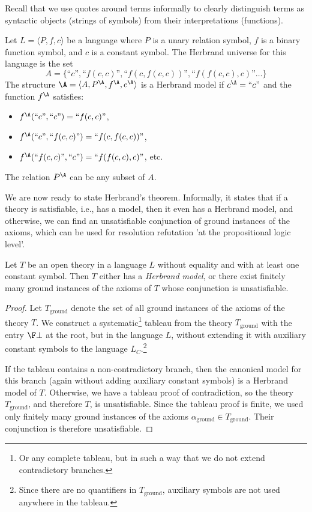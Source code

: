 Recall that we use quotes around terms informally to clearly distinguish terms as syntactic objects (strings of symbols) from their interpretations (functions).

\begin{example}
Let $L=\langle P,f,c\rangle$ be a language where $P$ is a unary relation symbol, $f$ is a binary function symbol, and $c$ is a constant symbol. The Herbrand universe for this language is the set
$$
A=\{\text{``$c$''},\text{``$f(c,c)$''},\text{``$f(c,f(c,c))$''},\text{``$f(f(c,c),c)$''}\dots\}
$$
The structure $\A=\langle A,P^\A,f^\A,c^\A\rangle$ is a Herbrand model if $c^\A=\text{``$c$''}$ and the function $f^\A$ satisfies:
\begin{itemize}
    \item $f^\A(\text{``$c$''},\text{``$c$''})=\text{``$f(c,c)$''}$,
    \item $f^\A(\text{``$c$''},\text{``$f(c,c)$''})=\text{``$f(c,f(c,c))$''}$,
    \item $f^\A(\text{``$f(c,c)$''},\text{``$c$''})=\text{``$f(f(c,c),c)$''}$, etc.
\end{itemize}
The relation $P^\A$ can be any subset of $A$.
\end{example}

We are now ready to state Herbrand's theorem. Informally, it states that if a theory is satisfiable, i.e., has a model, then it even has a Herbrand model, and otherwise, we can find an unsatisfiable conjunction of ground instances of the axioms, which can be used for resolution refutation 'at the propositional logic level'.

\begin{theorem}
Let $T$ be an open theory in a language $L$ without equality and with at least one constant symbol. Then $T$ either has a \emph{Herbrand model}, or there exist finitely many ground instances of the axioms of $T$ whose conjunction is unsatisfiable.
\end{theorem}
\begin{proof}
Let $T_\text{ground}$ denote the set of all ground instances of the axioms of the theory $T$. We construct a systematic\footnote{Or any complete tableau, but in such a way that we do not extend contradictory branches.} tableau from the theory $T_\text{ground}$ with the entry $\F\bot$ at the root, but in the language $L$, without extending it with auxiliary constant symbols to the language $L_C$.\footnote{Since there are no quantifiers in $T_\text{ground}$, auxiliary symbols are not used anywhere in the tableau.}

If the tableau contains a non-contradictory branch, then the canonical model for this branch (again without adding auxiliary constant symbols) is a Herbrand model of $T$. Otherwise, we have a tableau proof of contradiction, so the theory $T_\text{ground}$, and therefore $T$, is unsatisfiable. Since the tableau proof is finite, we used only finitely many ground instances of the axioms $\alpha_\text{ground}\in T_\text{ground}$. Their conjunction is therefore unsatisfiable.
\end{proof}

